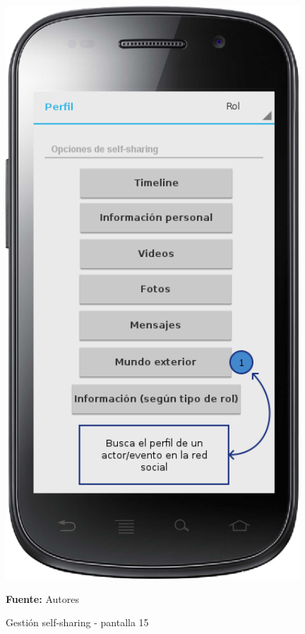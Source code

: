 \begin{figure}[!htb]
  \begin{center}
    \includegraphics[width=11cm]{./imagenes/UI/Self_sharing/self_sharing_15.png}
    \caption{Gestión self-sharing - pantalla 15}
    \label{fig:self_sharing_15}
    \textbf{Fuente:}  Autores
  \end{center}
\end{figure}


